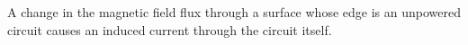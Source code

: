 A change in the magnetic field flux through a 
surface whose edge is an unpowered circuit
causes an induced current through the circuit itself.